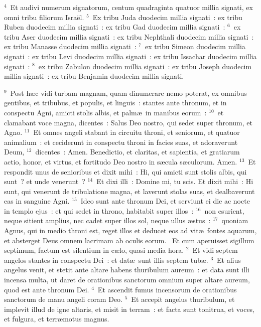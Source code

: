 ${}^{4}$~Et audivi numerum signatorum, centum quadraginta quatuor millia signati, ex omni tribu filiorum Isra\"el.
${}^{5}$~Ex tribu Juda duodecim millia signati~: ex tribu Ruben duodecim millia signati~: ex tribu Gad duodecim millia signati~:
${}^{6}$~ex tribu Aser duodecim millia signati~: ex tribu Nephthali duodecim millia signati~: ex tribu Manasse duodecim millia signati~:
${}^{7}$~ex tribu Simeon duodecim millia signati~: ex tribu Levi duodecim millia signati~: ex tribu Issachar duodecim millia signati~:
${}^{8}$~ex tribu Zabulon duodecim millia signati~: ex tribu Joseph duodecim millia signati~: ex tribu Benjamin duodecim millia signati.


${}^{9}$~Post h\ae c vidi turbam magnam, quam dinumerare nemo poterat, ex omnibus gentibus, et tribubus, et populis, et linguis~: stantes ante thronum, et in conspectu Agni, amicti stolis albis, et palm\ae\ in manibus eorum~:
${}^{10}$~et clamabant voce magna, dicentes~: Salus Deo nostro, qui sedet super thronum, et Agno.
${}^{11}$~Et omnes angeli stabant in circuitu throni, et seniorum, et quatuor animalium~: et ceciderunt in conspectu throni in facies suas, et adoraverunt Deum,
${}^{12}$~dicentes~: Amen. Benedictio, et claritas, et sapientia, et gratiarum actio, honor, et virtus, et fortitudo Deo nostro in s\ae cula s\ae culorum. Amen.
${}^{13}$~Et respondit unus de senioribus et dixit mihi~: Hi, qui amicti sunt stolis albis, qui sunt~? et unde venerunt~?
${}^{14}$~Et dixi illi~: Domine mi, tu scis. Et dixit mihi~: Hi sunt, qui venerunt de tribulatione magna, et laverunt stolas suas, et dealbaverunt eas in sanguine Agni.
${}^{15}$~Ideo sunt ante thronum Dei, et serviunt ei die ac nocte in templo ejus~: et qui sedet in throno, habitabit super illos~:
${}^{16}$~non esurient, neque sitient amplius, nec cadet super illos sol, neque ullus \ae stus~:
${}^{17}$~quoniam Agnus, qui in medio throni est, reget illos et deducet eos ad vit\ae\ fontes aquarum, et absterget Deus omnem lacrimam ab oculis eorum.
~Et cum aperuisset sigillum septimum, factum est silentium in c\ae lo, quasi media hora.
${}^{2}$~Et vidi septem angelos stantes in conspectu Dei~: et dat\ae\ sunt illis septem tub\ae .
${}^{3}$~Et alius angelus venit, et stetit ante altare habens thuribulum aureum~: et data sunt illi incensa multa, ut daret de orationibus sanctorum omnium super altare aureum, quod est ante thronum Dei.
${}^{4}$~Et ascendit fumus incensorum de orationibus sanctorum de manu angeli coram Deo.
${}^{5}$~Et accepit angelus thuribulum, et implevit illud de igne altaris, et misit in terram~: et facta sunt tonitrua, et voces, et fulgura, et terr\ae motus magnus.

